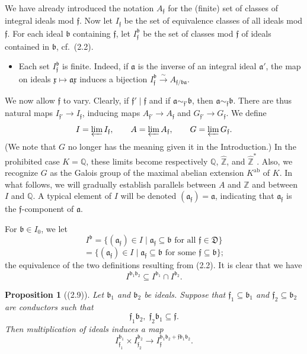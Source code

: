 \documentclass[12pt,a4paper]{article}
\theoremstyle{plain}
\newtheorem{proposition}[theorem]{Proposition}
\theoremstyle{definition}
\newcommand{\DD}{\mathfrak{D}}
\newcommand{\ff}{\mathfrak{f}}
\newcommand{\Z}{\mathbb{Z}}
\newcommand{\Q}{\mathbb{Q}}
\newcommand{\ab}{\mathrm{ab}}
\begin{document}
We have already introduced the notation $A_{\ff}$ for the (finite) set of classes of integral ideals mod $\ff$. Now let $I_{\ff}$ be the set of equivalence classes of all ideals mod $\ff$. For each ideal $\mathfrak{b}$ containing $\ff$, let $I_{\ff}^{\mathfrak{b}}$ be the set of classes mod $\ff$ of ideals contained in $\mathfrak{b}$, cf.~(2.2).

\begin{itemize}[leftmargin=2em]
\item[(2.8)] Each set $I_{\ff}^{\mathfrak{b}}$ is finite. Indeed, if $\mathfrak{a}$ is the inverse of an integral ideal $\mathfrak{a}'$, the map on ideals $\mathfrak{x}\mapsto\mathfrak{a}\mathfrak{x}$ induces a bijection $I_{\ff}^{\mathfrak{b}}\xrightarrow{\sim}A_{\ff/\mathfrak{b}\mathfrak{a}}$.
\end{itemize}

We now allow $\ff$ to vary. Clearly, if $\ff'\mid\ff$ and if $\mathfrak{a}\sim_{\ff'}\mathfrak{b}$, then $\mathfrak{a}\sim_{\ff}\mathfrak{b}$. There are thus natural maps $I_{\ff'}\to I_{\ff}$, inducing maps $A_{\ff'}\to A_{\ff}$ and $G_{\ff'}\to G_{\ff}$. We define
\[
I=\varprojlim I_{\ff},\qquad A=\varprojlim A_{\ff},\qquad G=\varprojlim G_{\ff}.
\]
(We note that $G$ no longer has the meaning given it in the Introduction.) In the prohibited case $K=\Q$, these limits become respectively $\Q$, $\hat{\Z}$, and $\hat{\Z}^*$. Also, we recognize $G$ as the Galois group of the maximal abelian extension $K^{\ab}$ of $K$. In what follows, we will gradually establish parallels between $A$ and $\Z$ and between $I$ and $\Q$. A typical element of $I$ will be denoted $(\mathfrak{a}_{\ff})=\mathfrak{a}$, indicating that $\mathfrak{a}_{\ff}$ is the $\ff$-component of $\mathfrak{a}$.

For $\mathfrak{b}\in I_0$, we let
\[
I^{\mathfrak{b}}=\{(\mathfrak{a}_{\ff})\in I\mid\mathfrak{a}_{\ff}\subseteq\mathfrak{b}\text{ for all }\ff\in\DD\}
\]
\[
=\{(\mathfrak{a}_{\ff})\in I\mid\mathfrak{a}_{\ff}\subseteq\mathfrak{b}\text{ for some }\ff\subseteq\mathfrak{b}\};
\]
the equivalence of the two definitions resulting from (2.2). It is clear that we have
\[
I^{\mathfrak{b}_1\mathfrak{b}_2}\subseteq I^{\mathfrak{b}_1}\cap I^{\mathfrak{b}_2}.
\]

\begin{proposition}[(2.9)]\label{prop:mult}
Let $\mathfrak{b}_1$ and $\mathfrak{b}_2$ be ideals. Suppose that $\ff_1\subseteq\mathfrak{b}_1$ and $\ff_2\subseteq\mathfrak{b}_2$ are conductors such that
\[
\ff_1\mathfrak{b}_2,\;\ff_2\mathfrak{b}_1\subseteq\ff.
\]
Then multiplication of ideals induces a map
\[
I_{\ff_1}^{\mathfrak{b}_1}\times I_{\ff_2}^{\mathfrak{b}_2}\to I_{\ff}^{\mathfrak{b}_1\mathfrak{b}_2+\ff\mathfrak{b}_1\mathfrak{b}_2}.
\]
\end{proposition}
\end{document}
